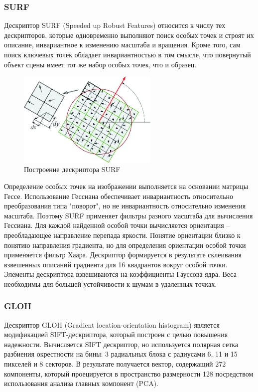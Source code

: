 {{{	\subsubsection{SURF}{
	Дескриптор SURF (Speeded up Robust Features) относится к числу тех дескрипторов, которые одновременно выполняют поиск особых точек и строят их описание, инвариантное к изменению масштаба и вращения. Кроме того, сам поиск ключевых точек обладает инвариантностью в том смысле, что повернутый объект сцены имеет тот же набор особых точек, что и образец.
	
	\begin{figure}[H]
		\centering                             
		\includegraphics[width=0.6\textwidth,keepaspectratio]{daisy/SURF.png}       
		\centering\caption{ Построение дескриптора SURF }
		\label{gradient_example}                           
	\end{figure}    
	
	Определение особых точек на изображении выполняется на основании матрицы Гессе. Использование Гессиана обеспечивает инвариантность относительно преобразования типа "поворот", но не инвариантность относительно изменения масштаба. Поэтому SURF применяет фильтры разного масштаба для вычисления Гессиана. Для каждой найденной особой точки вычисляется ориентация – преобладающее направление перепада яркости. Понятие ориентации близко к понятию направления градиента, но для определения ориентации особой точки применяется фильтр Хаара. Дескриптор формируется в результате склеивания взвешенных описаний градиента для 16 квадрантов вокруг особой точки. Элементы дескриптора взвешиваются на коэффициенты Гауссова ядра. Веса необходимы для большей устойчивости к шумам в удаленных точках.
	}

	\subsubsection{GLOH}{
	Дескриптор GLOH (Gradient location-orientation histogram) является модификацией SIFT-дескриптора, который построен с целью повышения надежности. Вычисляется SIFT дескриптор, но используется полярная сетка разбиения окрестности на бины: 3 радиальных блока с радиусами 6, 11 и 15 пикселей и 8 секторов. В результате получается вектор, содержащий 272 компоненты, который проецируется в пространство размерности 128 посредством использования анализа главных компонент (PCA).	
	
}}}}
